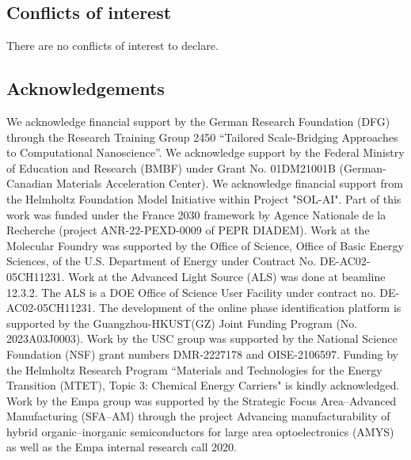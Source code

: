 \documentclass[a4paper]{article}
\begin{document}
\subsection*{Conflicts of interest}
There are no conflicts of interest to declare.

\subsection*{Acknowledgements}
We acknowledge financial support by the German Research Foundation (DFG) through the Research Training Group 2450 “Tailored Scale-Bridging Approaches to Computational Nanoscience”. We acknowledge support by the Federal Ministry of Education and Research (BMBF) under Grant No. 01DM21001B (German-Canadian Materials Acceleration Center). We acknowledge financial support from the Helmholtz Foundation Model Initiative within Project "SOL-AI". Part of this work was funded under the France 2030 framework by Agence Nationale de la Recherche (project ANR-22-PEXD-0009 of PEPR DIADEM). Work at the Molecular Foundry was supported by the Office of Science, Office of Basic Energy Sciences, of the U.S. Department of Energy under Contract No. DE-AC02-05CH11231. Work at the Advanced Light Source (ALS) was done at beamline 12.3.2. The ALS is a DOE Office of Science User Facility under contract no. DE-AC02-05CH11231. The development of the online phase identification platform is supported by the Guangzhou-HKUST(GZ) Joint Funding Program (No. 2023A03J0003). Work by the USC group was supported by the National Science Foundation (NSF) grant numbers DMR-2227178 and OISE-2106597. Funding by the Helmholtz Research Program “Materials and Technologies for the Energy Transition (MTET), Topic 3: Chemical Energy Carriers" is kindly acknowledged. Work by the Empa group was supported by the Strategic Focus Area–Advanced Manufacturing (SFA–AM) through the project Advancing manufacturability of hybrid organic–inorganic semiconductors for large area optoelectronics (AMYS) as well as the Empa internal research call 2020.


\end{document}
